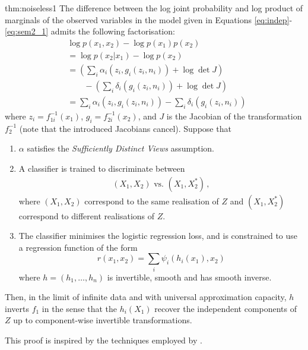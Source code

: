 \begin{reptheorem}{thm:noiseless1}
	The difference between the log joint probability and log product of marginals of the observed variables in the model given in Equations \ref{eq:indep}-\ref{eq:sem2_1} admits the following factorisation:
	\begin{align}
	&\log p({x}_1, {x}_2) - \log p({x}_1) p({x}_2) \nonumber \\
	&= \log p({x}_2 | {x}_1) - \log p({x}_2) \nonumber\\
	&= \left(\sum_i \alpha_i(z_{i}, g_i(z_i, n_i)) + \log \det J \right) \nonumber\\
	&\qquad - \left( \sum_i \delta_i(g_i(z_i, n_i)) + \log \det J\right) \nonumber\\
	&= \sum_i \alpha_i(z_{i}, g_i(z_i, n_i)) - \sum_i \delta_i(g_i(z_i, n_i)) \,
	\end{align}
	where $z_i=f^{-1}_{1i}({x}_1)$, $g_i=f^{-1}_{2i}({x}_2)$,
	and $J$ is the Jacobian of the transformation $f^{-1}_2$ (note that the introduced Jacobians cancel).
	Suppose that
	\begin{enumerate}
		\item $\alpha$ satisfies the \emph{Sufficiently Distinct Views} assumption.
		\item A classifier is trained to discriminate between
		\begin{align*}
		(X_{1},X_{2}) \text{ vs. } (X_{1},X_{2}^{*})\,,
		\end{align*}
		where $({X}_{1},{X}_{2})$ correspond to the same realisation of $Z$ and $({X}_{1},{X}_{2}^{*})$ correspond to different realisations of ${Z}$.
		\item The classifier minimises the logistic regression loss, and is constrained to use a regression function of the form
		\begin{equation*}
		r({x}_{1},{x}_{2})=\sum_{i}\psi_{i}(h_{i}({x}_{1}),{x}_{2})
		\end{equation*}
		where ${h} =(h_{1}, \ldots, h_{n})$  is invertible, smooth and has smooth inverse.
	\end{enumerate}
	
	Then, in the limit of infinite data and with universal approximation capacity, $h$ inverts ${f}_1$ in the sense that the $h_{i}(X_1)$ recover the independent components of $Z$ up to component-wise invertible transformations.
\end{reptheorem}

This proof is inspired by the techniques employed by \cite{hyvarinen19a}.

